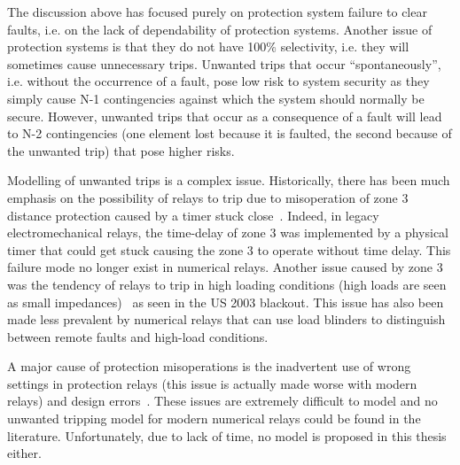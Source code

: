 The discussion above has focused purely on protection system failure to clear faults, i.e. on the lack of dependability of protection systems. Another issue of protection systems is that they do not have 100\% selectivity, i.e. they will sometimes cause unnecessary trips. Unwanted trips that occur ``spontaneously'', i.e. without the occurrence of a fault, pose low risk to system security as they simply cause N-1 contingencies against which the system should normally be secure. However, unwanted trips that occur as a consequence of a fault will lead to N-2 contingencies (one element lost because it is faulted, the second because of the unwanted trip) that pose higher risks.

Modelling of unwanted trips is a complex issue. Historically, there has been much emphasis on the possibility of relays to trip due to misoperation of zone 3 distance protection caused by a timer stuck close~\cite{ZoneVulnerability, OriginalManchesterModel}. Indeed, in legacy electromechanical relays, the time-delay of zone 3 was implemented by a physical timer that could get stuck causing the zone 3 to operate without time delay. This failure mode no longer exist in numerical relays. Another issue caused by zone 3 was the tendency of relays to trip in high loading conditions (high loads are seen as small impedances)~\cite{3rdZoneRevisited} as seen in the US 2003 blackout. This issue has also been made less prevalent by numerical relays that can use load blinders to distinguish between remote faults and high-load conditions.

A major cause of protection misoperations is the inadvertent use of wrong settings in protection relays (this issue is actually made worse with modern relays) and design errors~\cite{ProtectionMisoperationsBian2012}. These issues are extremely difficult to model and no unwanted tripping model for modern numerical relays could be found in the literature. Unfortunately, due to lack of time, no model is proposed in this thesis either.


